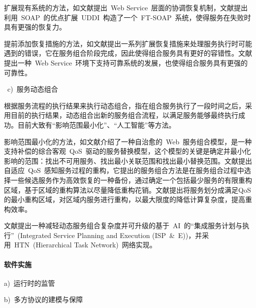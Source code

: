 扩展现有系统的方法，如文献\cite{cabrera2002web}提出~Web Service~层面的协调恢复机制，文献\cite{jeckle2003active}提出利用~SOAP~的优点扩展~UDDI~构造了一个~FT-SOAP~系统，使得服务在失败时具有更强的恢复力。

提前添加恢复措施的方法，如文献\cite{erradi2006recovery}提出一系列扩展恢复措施来处理服务执行时可能遇到的错误，它在服务组合阶段完成，因此使得组合服务具有更好的容错性。文献\cite{issarny2003coordinated}提出一种~Web Service~环境下支持可靠系统的发展，也使得组合服务具有更强的可靠性。

~c)~服务动态组合

根据服务流程的执行结果来执行动态组合，指在组合服务执行了一段时间之后，采用目前的执行结果，动态组合出新的服务组合流程，以满足服务能够最终执行成功。目前大致有“影响范围最小化”、“人工智能”等方法。

影响范围最小化的方法，如文献\cite{yin2009self}介绍了一种自治愈的~Web~服务组合模型，是一种支持补偿的综合客观~QoS~驱动的服务替换模型，这个模型的关键是确定并最小化影响的范围：找出不可用服务、找出最小关联范围和找出最小替换范围。文献\cite{li2011adaptive}提出自适应~QoS~感知服务过程的重构，它提出的服务组合方法是在服务组合过程中选择一些候选服务作为高效恢复的一种备份，通过确定一个包括最少服务的有限重构区域，基于区域的重构算法以尽量降低重构花销。文献\cite{lin2009efficient}提出将服务划分成满足QoS的最小重构区域，对区域内服务进行重构，以最大限度的降低计算复杂度，提高重构效率。

文献\cite{madhusudan2006declarative}提出一种减轻动态服务组合复杂度并可升级的基于~AI~的“集成服务计划与执行”~(Integrated Service Planning and Execution (ISP~\&~E))，并采用~HTN~(Hierarchical Task Network)~网络实现。

\paragraph{软件实施}

a)~运行时的监管


b)~多方协议的建模与保障

